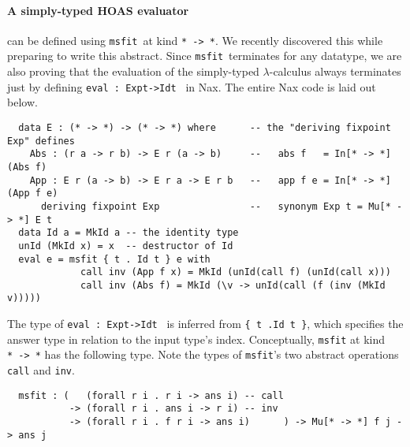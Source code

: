 \documentclass[a4paper]{easychair} %
\newcommand{\msfit}[0]{\texttt{msfit}}
\begin{document}
\paragraph{A simply-typed HOAS evaluator\!\!\!} can be defined
using \msfit\ at kind \texttt{*\,->\,*}. We recently discovered this
while preparing to write this abstract. Since \msfit\ terminates
for any datatype, we are also proving that the evaluation of
the simply-typed $\lambda$-calculus always terminates
just by defining \texttt{eval\,:\,Exp\;t\;->\;Id\;t\,} in Nax.
The entire Nax code is laid out below.
\vspace*{-1ex}
{\small
\begin{verbatim}
  data E : (* -> *) -> (* -> *) where      -- the "deriving fixpoint Exp" defines
    Abs : (r a -> r b) -> E r (a -> b)     --   abs f   = In[* -> *] (Abs f)
    App : E r (a -> b) -> E r a -> E r b   --   app f e = In[* -> *] (App f e)
      deriving fixpoint Exp                --   synonym Exp t = Mu[* -> *] E t
  data Id a = MkId a -- the identity type
  unId (MkId x) = x  -- destructor of Id
  eval e = msfit { t . Id t } e with
             call inv (App f x) = MkId (unId(call f) (unId(call x)))
             call inv (Abs f) = MkId (\v -> unId(call (f (inv (MkId v)))))
\end{verbatim} }
\vspace*{-.5ex}
\noindent
The type of \texttt{eval\,:\,Exp\;t\;->\;Id\;t\,} is inferred from
\texttt{\{\,t\,.\;Id t\,\}}, which specifies the answer type in relation
to the input type's index.
Conceptually, \texttt{msfit} at kind \texttt{*\,->\,*} has the following type.
Note the types of \texttt{msfit}'s two abstract operations
\texttt{call} and \texttt{inv}.\vspace*{-.5ex}
{\small
\begin{verbatim}
  msfit : (   (forall r i . r i -> ans i) -- call
           -> (forall r i . ans i -> r i) -- inv
           -> (forall r i . f r i -> ans i)      ) -> Mu[* -> *] f j -> ans j
\end{verbatim} }
\vspace*{-2.5ex}
\end{document}
